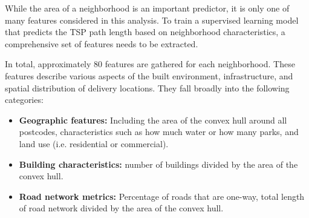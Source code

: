 
While the area of a neighborhood is an important predictor, it is only one of many features considered in this analysis.
To train a supervised learning model that predicts the TSP path length based on neighborhood characteristics, a comprehensive set
of features needs to be extracted.

In total, approximately 80 features are gathered for each neighborhood. These features describe various aspects of the built environment, infrastructure,
and spatial distribution of delivery locations. They fall broadly into the following categories:

\begin{itemize}
	\item \textbf{Geographic features:} Including the area of the convex hull around all postcodes, characteristics such as how much water or how many parks,
	      and land use (i.e. residential or commercial).
	\item \textbf{Building characteristics:} number of buildings divided by the area of the convex hull.
	\item \textbf{Road network metrics:} Percentage of roads that are one-way, total length of road network divided by the area of the convex hull.
\end{itemize}
